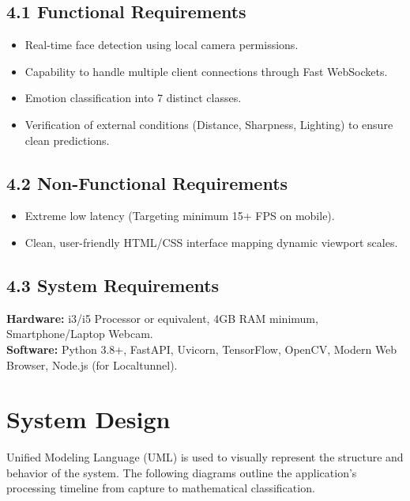 \documentclass[12pt,a4paper]{report}
\begin{document}
\section*{4.1 Functional Requirements}
\begin{itemize}
    \item Real-time face detection using local camera permissions.
    \item Capability to handle multiple client connections through Fast WebSockets.
    \item Emotion classification into 7 distinct classes.
    \item Verification of external conditions (Distance, Sharpness, Lighting) to ensure clean predictions.
\end{itemize}

\section*{4.2 Non-Functional Requirements}
\begin{itemize}
    \item Extreme low latency (Targeting minimum 15+ FPS on mobile).
    \item Clean, user-friendly HTML/CSS interface mapping dynamic viewport scales.
\end{itemize}

\section*{4.3 System Requirements}
\textbf{Hardware:} i3/i5 Processor or equivalent, 4GB RAM minimum, Smartphone/Laptop Webcam. \\
\textbf{Software:} Python 3.8+, FastAPI, Uvicorn, TensorFlow, OpenCV, Modern Web Browser, Node.js (for Localtunnel).

\clearpage


\chapter{System Design}

Unified Modeling Language (UML) is used to visually represent the structure and behavior of the system. The following diagrams outline the application's processing timeline from capture to mathematical classification. 
\end{document}
